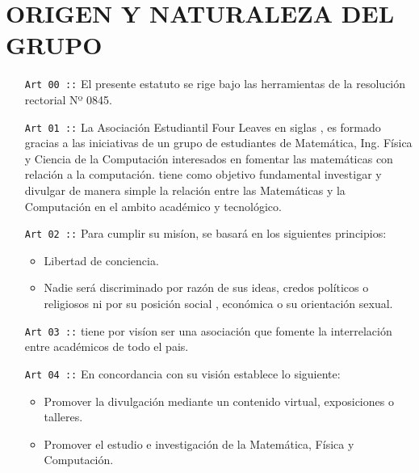 \chapter{ORIGEN Y NATURALEZA DEL GRUPO}

\begin{itemize}
  \item [\texttt{Art 00 ::}] El presente estatuto se rige bajo las herramientas de la resolución rectorial Nº 0845.
  \item [\texttt{Art 01 ::}] La Asociación Estudiantil Four Leaves en siglas \flae, es formado gracias a las iniciativas de un grupo de estudiantes de Matemática, Ing. Física y Ciencia de la Computación interesados en fomentar las matemáticas con relación a la computación. \flae tiene como objetivo fundamental investigar y divulgar de manera simple la relación entre las Matemáticas y la Computación en el ambito académico y tecnológico.
  \item [\texttt{Art 02 ::}] Para cumplir su misíon, \flae se basará en los siguientes principios:
  \begin{itemize}
    \item Libertad de conciencia.
    \item Nadie será discriminado por razón de sus ideas, credos políticos o religiosos ni por su posición social , económica o su orientación sexual.
  \end{itemize}
  \item [\texttt{Art 03 ::}] \flae  tiene por visíon ser una asociación que fomente la interrelación entre académicos de todo el pais.
  \item [\texttt{Art 04 ::}] En concordancia con su visión \flae  establece lo siguiente:
  \begin{itemize}
    \item Promover la divulgación mediante un contenido virtual, exposiciones o talleres.
    \item Promover el estudio e investigación de la Matemática, Física y Computación.

  \end{itemize}
\end{itemize}
